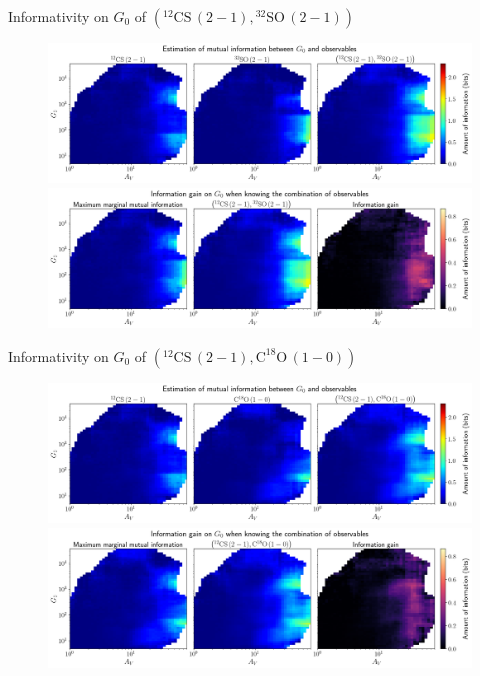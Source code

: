 \documentclass{beamer}
\begin{document}
\begin{frame}{Informativity on $G_0$ of $\left(\mathrm{^{12}CS\,(2-1)},\mathrm{^{32}SO\,(2-1)}\right)$}
    \begin{figure}
        \centering
        \includegraphics[width=0.95\linewidth]{../mi/g0__12cs21_32so21_mi.png}
        \vfill
        \includegraphics[width=0.95\linewidth]{../mi/g0__12cs21_32so21_mi_gain.png}
    \end{figure}
\end{frame}

\begin{frame}{Informativity on $G_0$ of $\left(\mathrm{^{12}CS\,(2-1)},\mathrm{C^{18}O\,(1-0)}\right)$}
    \begin{figure}
        \centering
        \includegraphics[width=0.95\linewidth]{../mi/g0__12cs21_c18o10_mi.png}
        \vfill
        \includegraphics[width=0.95\linewidth]{../mi/g0__12cs21_c18o10_mi_gain.png}
    \end{figure}
\end{frame}
\end{document}
